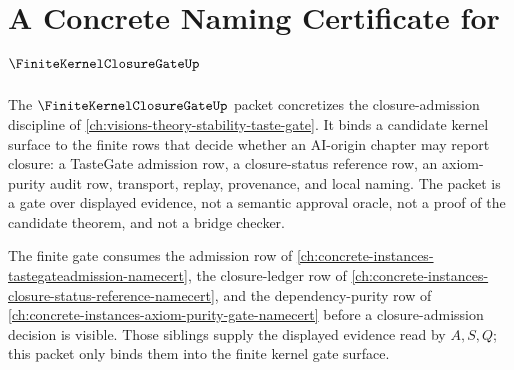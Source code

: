 \chapter{A Concrete Naming Certificate for $\FiniteKernelClosureGateUp$}
\label{ch:concrete-instances-finite-kernel-closure-gate-namecert}

The $\FiniteKernelClosureGateUp$ packet concretizes the closure-admission discipline of \autoref{ch:visions-theory-stability-taste-gate}. It binds a candidate kernel surface to the finite rows that decide whether an AI-origin chapter may report closure: a TasteGate admission row, a closure-status reference row, an axiom-purity audit row, transport, replay, provenance, and local naming. The packet is a gate over displayed evidence, not a semantic approval oracle, not a proof of the candidate theorem, and not a bridge checker.

The finite gate consumes the admission row of \autoref{ch:concrete-instances-tastegateadmission-namecert}, the closure-ledger row of \autoref{ch:concrete-instances-closure-status-reference-namecert}, and the dependency-purity row of \autoref{ch:concrete-instances-axiom-purity-gate-namecert} before a closure-admission decision is visible. Those siblings supply the displayed evidence read by $A,S,Q$; this packet only binds them into the finite kernel gate surface.

